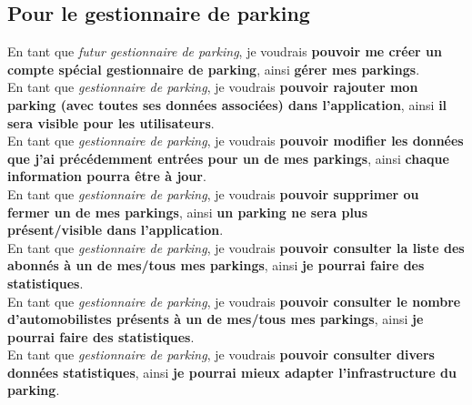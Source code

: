 \documentclass[a4paper,11pt]{article}
\newcommand{\userstory}[3]{En tant #1, je voudrais \textbf{#2}, ainsi \textbf{#3}.\\}
\newcommand{\etgp}[2]{\userstory{que \textit{gestionnaire de parking}}{#1}{#2}}
\begin{document}
\subsection{Pour le gestionnaire de parking}
  \noindent
  \userstory{que \textit{futur gestionnaire de parking}}{pouvoir me créer un compte spécial gestionnaire de parking}{gérer mes parkings}
  \etgp{pouvoir rajouter mon parking (avec toutes ses données associées) dans l'application}{il sera visible pour les utilisateurs}
  \etgp{pouvoir modifier les données que j'ai précédemment entrées pour un de mes parkings}{chaque information pourra être à jour}
  \etgp{pouvoir supprimer ou fermer un de mes parkings}{un parking ne sera plus présent/visible dans l'application} 
  \etgp{pouvoir consulter la liste des abonnés à un de mes/tous mes parkings}{je pourrai faire des statistiques}
  \etgp{pouvoir consulter le nombre d'automobilistes présents à un de mes/tous mes parkings}{je pourrai faire des statistiques}
  \etgp{pouvoir consulter divers données statistiques}{je pourrai mieux adapter l'infrastructure du parking}
\end{document}
